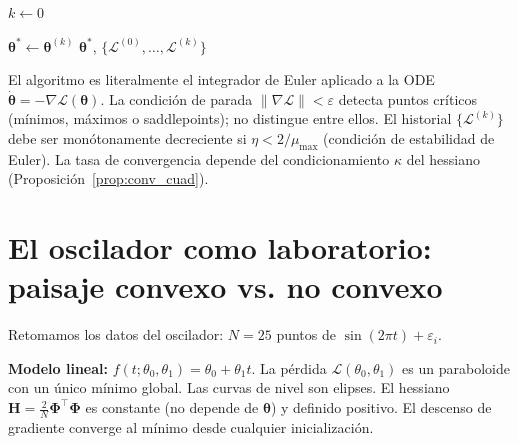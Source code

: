 \begin{algorithm}[H]
\caption{Descenso de gradiente con criterio de convergencia}
\label{alg:gd}
 
$k \leftarrow 0$\;
 
$\bm{\theta}^* \leftarrow \bm{\theta}^{(k)}$\;
\Return $\bm{\theta}^*$, $\{\mathcal{L}^{(0)}, \ldots,
        \mathcal{L}^{(k)}\}$\;
\end{algorithm}
 
El algoritmo es literalmente el integrador de Euler aplicado a la ODE
$\dot{\bm{\theta}} = -\nabla\mathcal{L}(\bm{\theta})$. La condición de
parada $\|\nabla\mathcal{L}\| < \varepsilon$ detecta puntos críticos
(mínimos, máximos o saddlepoints); no distingue entre ellos. El historial
$\{\mathcal{L}^{(k)}\}$ debe ser monótonamente decreciente si
$\eta < 2/\mu_{\max}$ (condición de estabilidad de Euler).
La tasa de convergencia depende del condicionamiento $\kappa$ del hessiano
(Proposición~\ref{prop:conv_cuad}).

\section{El oscilador como laboratorio: paisaje convexo vs. no convexo}
\label{sec:oscilador3}


Retomamos los datos del oscilador: $N = 25$ puntos de
$\sin(2\pi t) + \varepsilon_i$.

\textbf{Modelo lineal:} $f(t;\theta_0,\theta_1) = \theta_0 +
\theta_1 t$. La pérdida $\mathcal{L}(\theta_0,\theta_1)$ es un
paraboloide con un único mínimo global. Las curvas de nivel son elipses.
El hessiano $\bm{H} = \frac{2}{N}\bm{\Phi}^\top\bm{\Phi}$ es constante
(no depende de $\bm{\theta}$) y definido positivo. El descenso de
gradiente converge al mínimo desde cualquier inicialización.

